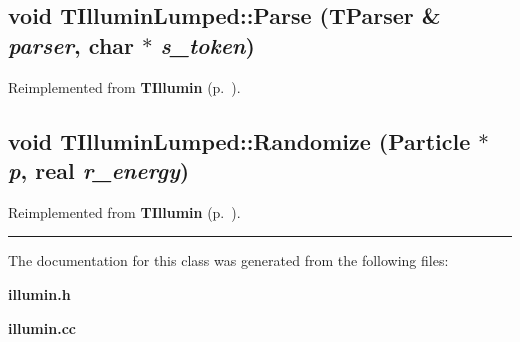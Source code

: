 \subsection{\setlength{\rightskip}{0pt plus 5cm}void TIllumin\-Lumped::Parse ({\bf TParser} \& {\em parser}, char $\ast$ {\em s\_\-token})\hspace{0.3cm}{\tt  [virtual]}}



Reimplemented from {\bf TIllumin} {\rm (p.~\pageref{TIllumin_a0})}.\label{TIlluminLumped_a2}
\subsection{\setlength{\rightskip}{0pt plus 5cm}void TIllumin\-Lumped::Randomize ({\bf Particle} $\ast$ {\em p}, {\bf real} {\em r\_\-energy})\hspace{0.3cm}{\tt  [virtual]}}



Reimplemented from {\bf TIllumin} {\rm (p.~\pageref{TIllumin_a1})}.\vspace{0.4cm}\hrule\vspace{0.2cm}
The documentation for this class was generated from the following files:\begin{CompactItemize}
\item 
{\bf illumin.h}\item 
{\bf illumin.cc}\end{CompactItemize}
